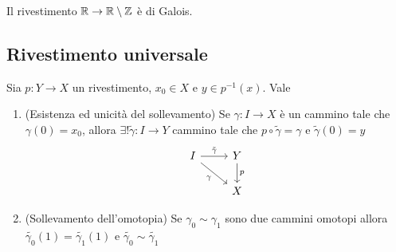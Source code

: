\documentclass[]{article}
\begin{document}
\begin{example} \nl
    Il rivestimento $\mathbb{R} \to \mathbb{R} \setminus \mathbb{Z}$ \`e di Galois.
\end{example}

\begin{example}  \nl

\end{example}

\subsection{Rivestimento universale}

\begin{theorem}  \nl
    Sia $p: Y \to X$ un rivestimento, $x_0 \in X$ e $y \in p^{-1}(x)$. Vale \nl
    \begin{enumerate}
        \item (Esistenza ed unicit\`a del sollevamento) \nl
            Se $\gamma: I \to X$ \`e un cammino tale che $\gamma(0) = x_0$, allora
            $\exists! \tilde{\gamma}: I \to Y$ cammino tale che $p \circ \tilde{\gamma} = \gamma$ e $\tilde{\gamma}(0) = y$
            \[\begin{tikzcd}
            I & Y \\
            & X
            \arrow["{\tilde{\gamma}}", from=1-1, to=1-2]
            \arrow["\gamma"', from=1-1, to=2-2]
            \arrow["p", from=1-2, to=2-2]
        \end{tikzcd}\]
        \item (Sollevamento dell'omotopia) \nl
        Se $\gamma_0 \sim \gamma_1$ sono due cammini omotopi allora $\tilde{\gamma_0}(1) = \tilde{\gamma_1}(1)$ e $\tilde{\gamma_0} \sim \tilde{\gamma_1}$ 
    \end{enumerate}
\end{theorem}
\end{document}

